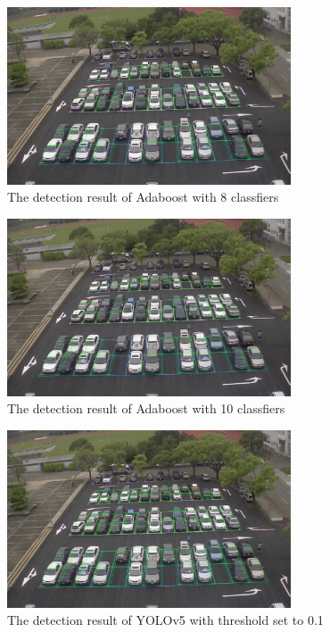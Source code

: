 \documentclass{article}[12pt]
\begin{document}
\begin{figure}[H]
    \centering
    \includegraphics[width=0.75\textwidth]{figure/Adaboost_first_frame_8.png}
    \caption{The detection result of Adaboost with 8 classfiers}
\end{figure}

\begin{figure}[H]
    \centering
    \includegraphics[width=0.75\textwidth]{figure/Adaboost_first_frame_10.png}
    \caption{The detection result of Adaboost with 10 classfiers}
\end{figure}

\begin{figure}[H]
    \centering
    \includegraphics[width=0.75\textwidth]{figure/Yolov5_first_frame_1.png}
    \caption{The detection result of YOLOv5 with threshold set to 0.1}
\end{figure}
\end{document}
